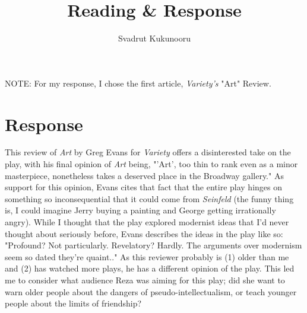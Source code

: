 \documentclass{article}
\title{Reading \& Response}
\author{Svadrut Kukunooru}
\begin{document}
    \maketitle
    NOTE: For my response, I chose the first article, \textit{Variety's} "Art" Review. 
\section{Response}%
\label{sec:Response}
This review of \textit{Art} by Greg Evans for \textit{Variety} offers a disinterested take on the play, with his final opinion of \textit{Art} being, "'Art', too thin to rank even as a minor masterpiece, nonetheless takes a deserved place in the Broadway gallery." As support for this opinion, Evans cites that fact that the entire play hinges on something so inconsequential that it could come from \textit{Seinfeld} (the funny thing is, I could imagine Jerry buying a painting and George getting irrationally angry). While I thought that the play explored modernist ideas that I'd never thought about seriously before, Evans describes the ideas in the play like so: "Profound? Not particularly. Revelatory? Hardly. The arguments over modernism seem so dated they’re quaint.." As this reviewer probably is (1) older than me and (2) has watched more plays, he has a different opinion of the play. This led me to consider what audience Reza was aiming for this play; did she want to warn older people about the dangers of pseudo-intellectualism, or teach younger people about the limits of friendship? 
\end{document}
